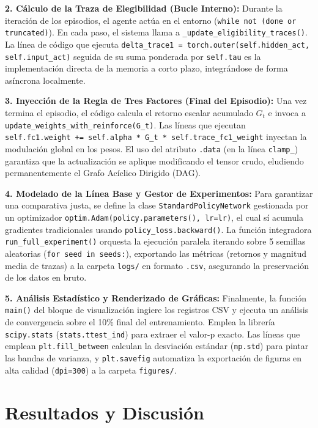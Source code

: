 \documentclass[conference, 10pt]{IEEEtran}
\begin{document}
\textbf{2. Cálculo de la Traza de Elegibilidad (Bucle Interno):}
Durante la iteración de los episodios, el agente actúa en el entorno (\texttt{while not (done or truncated)}). En cada paso, el sistema llama a \texttt{\_update\_eligibility\_traces()}. La línea de código que ejecuta \texttt{delta\_trace1 = torch.outer(self.hidden\_act, self.input\_act)} seguida de su suma ponderada por \texttt{self.tau} es la implementación directa de la memoria a corto plazo, integrándose de forma asíncrona localmente.

\textbf{3. Inyección de la Regla de Tres Factores (Final del Episodio):}
Una vez termina el episodio, el código calcula el retorno escalar acumulado $G_t$ e invoca a \texttt{update\_weights\_with\_reinforce(G\_t)}. Las líneas que ejecutan \texttt{self.fc1.weight += self.alpha * G\_t * self.trace\_fc1\_weight} inyectan la modulación global en los pesos. El uso del atributo \texttt{.data} (en la línea \texttt{clamp\_}) garantiza que la actualización se aplique modificando el tensor crudo, eludiendo permanentemente el Grafo Acíclico Dirigido (DAG).

\textbf{4. Modelado de la Línea Base y Gestor de Experimentos:}
Para garantizar una comparativa justa, se define la clase \texttt{StandardPolicyNetwork} gestionada por un optimizador \texttt{optim.Adam(policy.parameters(), lr=lr)}, el cual sí acumula gradientes tradicionales usando \texttt{policy\_loss.backward()}. La función integradora \texttt{run\_full\_experiment()} orquesta la ejecución paralela iterando sobre 5 semillas aleatorias (\texttt{for seed in seeds:}), exportando las métricas (retornos y magnitud media de trazas) a la carpeta \texttt{logs/} en formato \texttt{.csv}, asegurando la preservación de los datos en bruto.

\textbf{5. Análisis Estadístico y Renderizado de Gráficas:}
Finalmente, la función \texttt{main()} del bloque de visualización ingiere los registros CSV y ejecuta un análisis de convergencia sobre el 10\% final del entrenamiento. Emplea la librería \texttt{scipy.stats} (\texttt{stats.ttest\_ind}) para extraer el valor-p exacto. Las líneas que emplean \texttt{plt.fill\_between} calculan la desviación estándar (\texttt{np.std}) para pintar las bandas de varianza, y \texttt{plt.savefig} automatiza la exportación de figuras en alta calidad (\texttt{dpi=300}) a la carpeta \texttt{figures/}.

\section{Resultados y Discusión}
\end{document}
